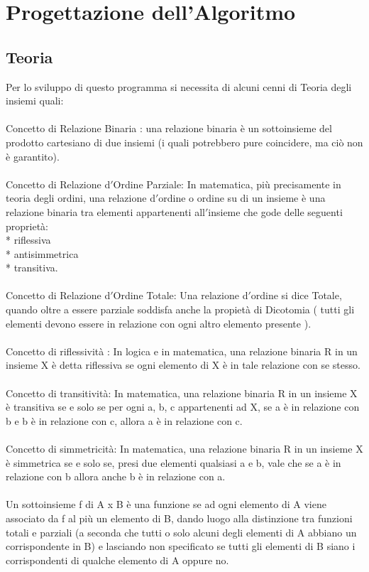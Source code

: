 \documentclass[11pt, a4paper, titlepage, block]{article}
\begin{document}
	
	
	\newpage                        
\section{Progettazione dell'Algoritmo}
\subsection{Teoria}
Per lo sviluppo di questo programma si necessita di alcuni cenni di Teoria degli insiemi quali:\\
\\
Concetto di Relazione Binaria : una relazione binaria \`e un sottoinsieme del prodotto
cartesiano di due insiemi (i quali potrebbero pure coincidere,
ma ci\`o non \`e garantito).\\
\\
Concetto di Relazione d$'$Ordine Parziale: In matematica, pi\`u precisamente in teoria degli ordini, una relazione d$'$ordine o ordine su di un insieme \`e una relazione binaria tra elementi appartenenti all$'$insieme che gode delle seguenti propriet\`a:\\
* riflessiva\\
* antisimmetrica\\
* transitiva.\\
\\
Concetto di Relazione d$'$Ordine Totale: Una relazione d$'$ordine si dice Totale, quando oltre a essere parziale soddisfa anche la propiet\`a di Dicotomia ( tutti gli elementi devono essere in relazione con ogni altro elemento presente ).\\
\\
Concetto di riflessivit\`a : In logica e in matematica, una relazione binaria R in un insieme X \`e detta riflessiva se ogni elemento di X \`e in tale relazione con se stesso. \\
\\
Concetto di transitivit\`a: In matematica, una relazione binaria R in un insieme X \`e transitiva se e solo se per ogni a, b, c appartenenti ad X, se a \`e in relazione con b e b \`e in relazione con c, allora a \`e in relazione con c. \\
\\
Concetto di simmetricit\`a: In matematica, una relazione binaria R in un insieme X \`e simmetrica se e solo se, presi due elementi qualsiasi a e b, vale che se a \`e in relazione con b allora anche b \`e in relazione con a.\\
\\
Un sottoinsieme f di A x B \`e una funzione se ad ogni
elemento di A viene associato da f al pi\`u un elemento di B,
dando luogo alla distinzione tra funzioni totali e parziali
(a seconda che tutti o solo alcuni degli elementi di A
abbiano un corrispondente in B) e lasciando non specificato
se tutti gli elementi di B siano i corrispondenti di
qualche elemento di A oppure no.\\
\newpage
\end{document}
